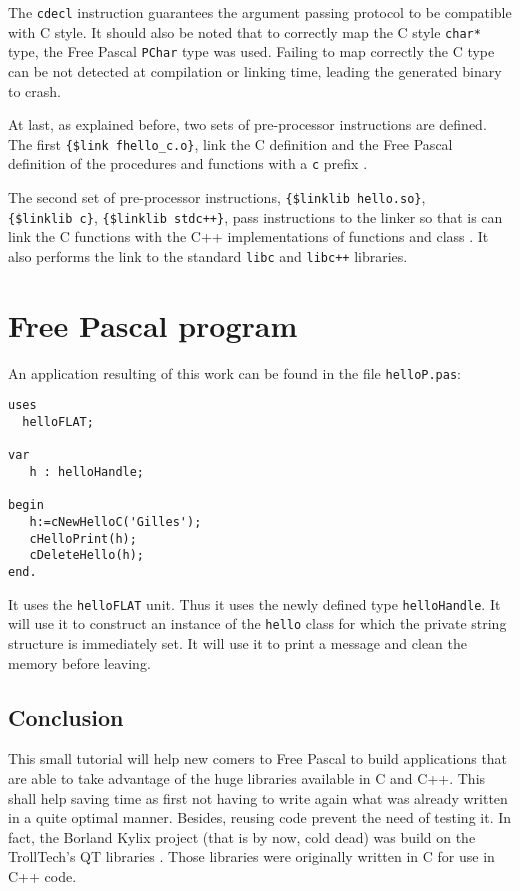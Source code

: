 \documentclass[A4paper]{article}
\begin{document}
The \verb|cdecl| instruction guarantees the argument passing protocol to be
compatible with C style. It should also be noted that to correctly map the
C style \verb|char*| type, the Free Pascal \verb|PChar| type was
used. Failing to map correctly the C type can be not detected at compilation
or linking time, leading the generated binary to crash.

At last, as explained before, two sets of pre-processor instructions are
defined. The first \verb|{$link fhello_c.o}|,%
 link the C definition and the
Free Pascal definition of the procedures and functions with a \verb|c| prefix
\cite{FPDoc,FPFor}.

The second set of pre-processor instructions, \verb|{$linklib hello.so}|,%
\\\verb|{$linklib c}|,%
 \verb|{$linklib stdc++}|,%
 pass instructions to the
linker so that is can link the C functions with the C++ implementations of
functions and class \cite{FPFor,FPDoc}. It also performs the link to the
standard \verb|libc| and \verb|libc++| libraries.

\section{Free Pascal program}

An application resulting of this work can be found in the file
\verb|helloP.pas|:

\begin{verbatim}
uses
  helloFLAT;

var
   h : helloHandle;

begin
   h:=cNewHelloC('Gilles');
   cHelloPrint(h);
   cDeleteHello(h);
end.
\end{verbatim}

It uses the \verb|helloFLAT| unit. Thus it uses the newly defined type
\verb|helloHandle|. It will use it to construct an instance of the
\verb|hello| class for which the private string structure is immediately
set. It will use it to print a message and clean the memory before leaving.

\subsection{Conclusion}

This small tutorial will help new comers to Free Pascal to build applications
that are able to take advantage of the huge libraries available in C and
C++. This shall help saving time as first not having to write again what was
already written in a quite optimal manner. Besides, reusing code prevent the
need of testing it. In fact, the Borland Kylix project (that is by now, cold
dead) was build on the TrollTech's QT libraries \cite{Delphi}. Those libraries
were originally written in C for use in C++ code.
\end{document}
